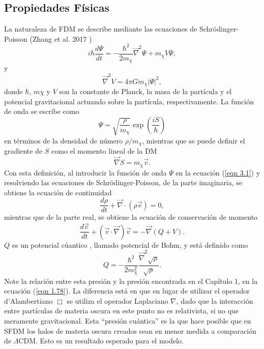 \documentclass[a4paper,openright,10pt, oneside, final]{book}
\begin{document}
\subsection{Propiedades Físicas}
La naturaleza de FDM se describe mediante las ecuaciones de Schrödinger-Poisson (Zhang et al. 2017 \cite{3.1})
\begin{equation}
i\hbar \frac{d \Psi}{dt} 
=
-\frac{\hbar^{2}}{2m_{\chi}} \vec{\nabla}^{2}\Psi + m_{\chi}V\Psi,\label{eqn 3.1}
\end{equation}
y
\begin{equation}
\vec{\nabla}^{2}V = 4\pi G m_{\chi}|\Psi|^{2},\label{eqn 3.2}
\end{equation}
donde $\hbar$, $m\chi$ y $V$ son la constante de Planck, la masa de la partícula y el potencial gravitacional actuando sobre la partícula, respectivamente. La función de onda se escribe como
\begin{equation}
\Psi = \sqrt{\frac{\rho}{m_{\chi}}}\exp(\frac{iS}{\hbar})\label{eqn 3.3}
\end{equation}
en términos de la densidad de número $\rho/m_{\chi}$, mientras que se puede definir el gradiente de $S$ como el momento lineal de la DM
\begin{equation}
\vec{\nabla}S = m_{\chi}\vec{v}.\label{eqn 3.4}
\end{equation}
Con esta definición, al introducir la función de onda $\Psi$ en la ecuación (\ref{eqn 3.1}) y resolviendo las ecuaciones de Schrödinger-Poisson, de la parte imaginaria, se obtiene la ecuación de continuidad
\begin{equation}
\frac{d\rho}{dt} + \vec{\nabla}\cdot(\rho\vec{v}) = 0,\label{eqn 3.5}
\end{equation}
mientras que de la parte real, se obtiene la ecuación de conservación de momento
\begin{equation}
\frac{d\vec{v}}{dt} + (\vec{v}\cdot\vec{\nabla})\vec{v} 
=
-\vec{\nabla}(Q + V).\label{eqn 3.6}
\end{equation}
$Q$ es un potencial cúantico , llamado potencial de Bohm, y está definido como
\begin{equation}
Q 
=
-\frac{\hbar^{2}}{2m^{2}_{\chi}}\frac{\vec{\nabla}^{2}\sqrt{\rho}}{\sqrt{\rho}}.\label{eqn 3.7}
\end{equation}
Note la relación entre esta presión y la presión encontrada en el Capítulo 1, en la ecuación (\ref{eqn 1.78}). La diferencia está en que en lugar de utilizar el operador d'Alambertiano $\Box$ se utiliza el operador Laplaciano $\nabla$, dado que la interacción entre partículas de materia oscura en este punto no es relativista, si no que meramente gravitacional. Esta ``presión cuántica'' es la que hace posible que en SFDM los halos de materia oscura creados sean en menor medida a comparación de $\Lambda$CDM. Esto es un resultado esperado para el modelo.
\end{document}
